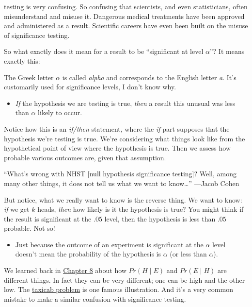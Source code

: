 \documentclass[justified]{tufte-book}
\newcommand{\given}{\mid}
\newcommand{\p}{Pr}
\newenvironment{warning}{\begin{itemize}\item[\faBan]}{\end{itemize}}
\theoremstyle{definition}
\theoremstyle{definition}
\theoremstyle{definition}
\theoremstyle{remark}
\begin{document}
 testing is very confusing. So confusing that scientists, and even statisticians, often misunderstand and misuse it. Dangerous medical treatments have been approved and administered as a result. Scientific careers have even been built on the misuse of significance testing.

So what exactly does it mean for a result to be ``significant at level \(\alpha\)''? It means exactly this:

\begin{marginfigure}
The Greek letter \(\alpha\) is called \emph{alpha} and corresponds to
the English letter \emph{a}. It's customarily used for significance
levels, I don't know why.
\end{marginfigure}

\begin{warning}
\emph{If} the hypothesis we are testing is true, \emph{then} a result
this unusual was less than \(\alpha\) likely to occur.
\end{warning}

Notice how this is an \emph{if/then} statement, where the \emph{if} part supposes that the hypothesis we're testing is true. We're considering what things look like from the hypothetical point of view where the hypothesis is true. Then we assess how probable various outcomes are, given that assumption.

\begin{marginfigure}
``What's wrong with NHST {[}null hypothesis significance testing{]}?
Well, among many other things, it does not tell us what we want to
know\ldots{}'' ---Jacob Cohen
\end{marginfigure}

But notice, what we really want to know is the reverse thing. We want to know: \emph{if} we get \(k\) heads, \emph{then} how likely is it the hypothesis is true? You might think if the result is significant at the \(.05\) level, then the hypothesis is less than \(.05\) probable. Not so!

\begin{warning}
Just because the outcome of an experiment is significant at the
\(\alpha\) level doesn't mean the probability of the hypothesis is
\(\alpha\) (or less than \(\alpha\)).
\end{warning}

We learned back in \protect\hyperlink{bayes-theorem}{Chapter 8} about how \(\p(H \given E)\) and \(\p(E \given H)\) are different things. In fact they can be very different; one can be high and the other low. The \protect\hyperlink{fig:taxigrid}{taxicab problem} is one famous illustration. And it's a very common mistake to make a similar confusion with significance testing.
\end{document}
